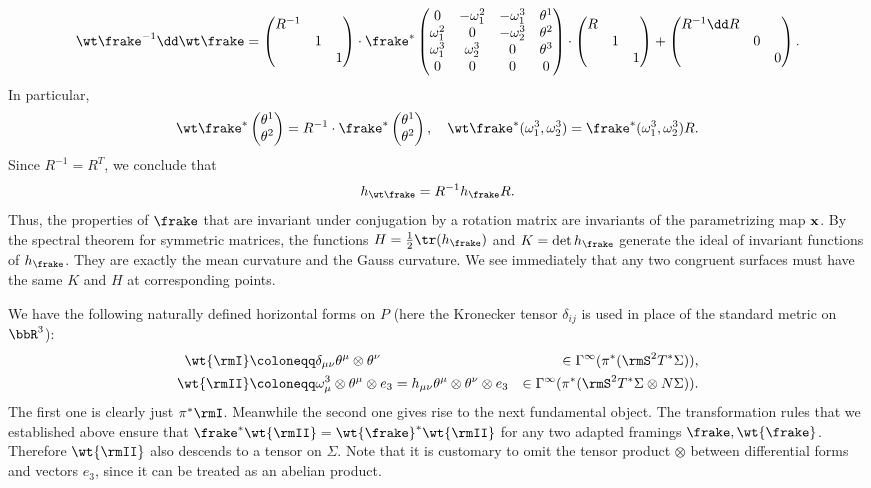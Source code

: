 \[\wt\frake^{-1}\dd\wt\frake=
\begin{pmatrix}
    R^{-1} &&\\
    &1 &\\
    &&1
\end{pmatrix}\cdot
\frake^\ast 
\begin{pmatrix}
    0 & -\omega_1^2 & -\omega_1^3& \theta^1\\
    \omega_1^2 & 0 & -\omega_2^3 & \theta^2\\
    \omega_1^3 & \omega_2^3 & 0 & \theta^3\\
    0 & 0& 0& 0
\end{pmatrix}\cdot
\begin{pmatrix}
    R &&\\
    &1 &\\
    &&1
\end{pmatrix}+
\begin{pmatrix}
    R^{-1}\dd R &&\\
    &0 &\\
    &&0
\end{pmatrix}.
\]
In particular, 
\[\wt\frake^\ast \begin{pmatrix}
    \theta^1 \\ \theta^2
\end{pmatrix}=R^{-1}\cdot \frake^\ast \begin{pmatrix}
    \theta^1 \\ \theta^2
\end{pmatrix},
\quad 
\wt\frake^\ast(\omega_1^3,\omega_2^3)=\frake^\ast(\omega_1^3,\omega_2^3)R.
\]
Since $R^{-1}=R^T$, we conclude that 
\[h_{\wt\frake}=R^{-1}h_\frake R.\]
Thus, the properties of $\frake$ that are invariant under conjugation by a rotation matrix are invariants of the parametrizing map $\bf{x}$. By the spectral theorem for symmetric matrices, the functions $H=\frac12 \tr(h_\frake)$ and $K=\det h_\frake$ generate the ideal of invariant functions of $h_\frake$. They are exactly the mean curvature and the Gauss curvature. We see immediately that any two congruent surfaces must have the same $K$ and $H$ at corresponding points.


We have the following naturally defined horizontal forms on $P$ (here the Kronecker tensor $\delta_{ij}$ is used in place of the standard metric on $\bbR^3$):
\begin{align}
    \wt{\rmI}&\coloneqq \delta_{\mu\nu} \theta^\mu\otimes\theta^\nu &\in\Gamma^\infty(\pi^\ast(\rmS^2 T^\ast \Sigma)),\\
    \wt{\rmII}&\coloneqq \omega^3_\mu\otimes\theta^\mu\otimes e_3=
    h_{\mu\nu}\theta^\mu\otimes\theta^\nu\otimes e_3
    &\in \Gamma^\infty(\pi^\ast(\rmS^2 T^\ast \Sigma\otimes N\Sigma)).
\end{align}
The first one is clearly just $\pi^\ast\rmI$. Meanwhile the second one gives rise to the next fundamental object. The transformation rules that we established above ensure that $\frake^\ast \wt{\rmII}=\wt{\frake}^\ast \wt{\rmII}$ for any two adapted framings $\frake,\wt{\frake}$. Therefore $\wt{\rmII}$ also descends to a tensor on $\Sigma$. Note that it is customary to omit the tensor product $\otimes$ between differential forms and vectors $e_3$, since it can be treated as an abelian product.

